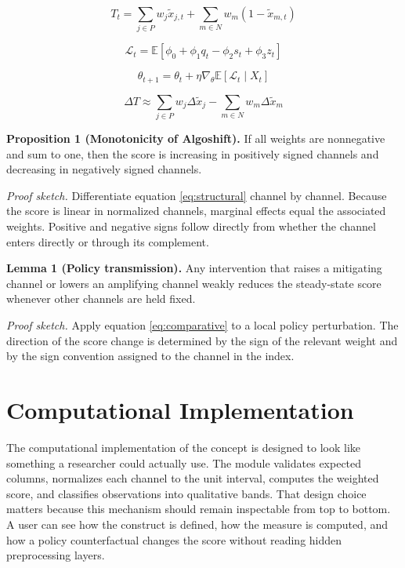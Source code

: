 \documentclass[12pt]{article}
\begin{document}
\begin{equation}
T_t = \sum_{j \in P} w_j \tilde{x}_{j,t} + \sum_{m \in N} w_m (1 - \tilde{x}_{m,t})
\label{eq:structural}
\end{equation}

\begin{equation}
\mathcal{L}_t = \mathbb{E}\left[\phi_0 + \phi_1 q_t - \phi_2 s_t + \phi_3 z_t\right]
\label{eq:loss}
\end{equation}

\begin{equation}
\theta_{t+1} = \theta_t + \eta \nabla_\theta \mathbb{E}[\mathcal{L}_t \mid X_t]
\label{eq:update}
\end{equation}

\begin{equation}
\Delta T \approx \sum_{j \in P} w_j \Delta \tilde{x}_j - \sum_{m \in N} w_m \Delta \tilde{x}_m
\label{eq:comparative}
\end{equation}

\textbf{Proposition 1 (Monotonicity of Algoshift).} If all weights are nonnegative and sum to one, then the score is increasing in positively signed channels and decreasing in negatively signed channels.

\textit{Proof sketch.} Differentiate equation \eqref{eq:structural} channel by channel. Because the score is linear in normalized channels, marginal effects equal the associated weights. Positive and negative signs follow directly from whether the channel enters directly or through its complement.

\textbf{Lemma 1 (Policy transmission).} Any intervention that raises a mitigating channel or lowers an amplifying channel weakly reduces the steady-state score whenever other channels are held fixed.

\textit{Proof sketch.} Apply equation \eqref{eq:comparative} to a local policy perturbation. The direction of the score change is determined by the sign of the relevant weight and by the sign convention assigned to the channel in the index.

\section{Computational Implementation}
The computational implementation of the concept is designed to look like something a researcher could actually use. The module validates expected columns, normalizes each channel to the unit interval, computes the weighted score, and classifies observations into qualitative bands. That design choice matters because this mechanism should remain inspectable from top to bottom. A user can see how the construct is defined, how the measure is computed, and how a policy counterfactual changes the score without reading hidden preprocessing layers.
\end{document}
